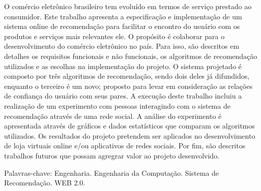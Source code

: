 O comércio eletrônico brasileiro tem evoluído em termos de serviço prestado ao consumidor. Este trabalho apresenta a especificação e implementação de um sistema online de recomendação para facilitar o encontro do usuário com os produtos e serviços mais relevantes ele. O propósito é colaborar para o desenvolvimento do comércio eletrônico no país. Para isso, são descritos em detalhes os requisitos funcionais e não funcionais, os algoritmos de recomendação utilizados e as escolhas na implementação do projeto. 
O sistema projetado é composto por três algoritmos de recomendação, sendo dois deles já difundidos, enquanto o terceiro é um novo; proposto para levar em consideração as relações de confiança do usuário com seus pares. 
A execução deste trabalho incluiu a realização de um experimento com pessoas interagindo com o sistema de recomendação através de uma rede social. A análise do experimento é apresentada através de gráficos e dados estatísticos que comparam os algoritmos utilizados. 
Os resultados do projeto pretendem ser aplicados no desenvolvimento de loja virtuais online e/ou aplicativos de redes sociais. Por fim, são descritos trabalhos futuros que possam agregrar valor ao projeto desenvolvido. 

Palavras-chave: Engenharia. Engenharia da Computação. Sistema de Recomendação. WEB 2.0.